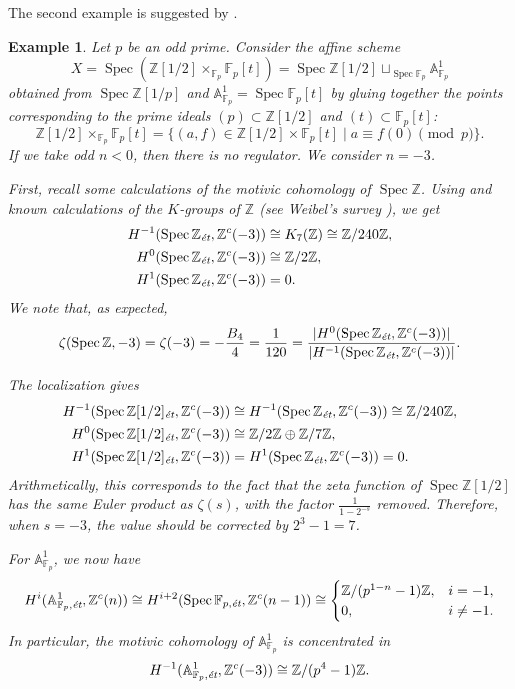 \documentclass[draft]{article}
\DeclareMathOperator{\Spec}{Spec}
\newcommand{\FF}{\mathbb{F}}
\newcommand{\ZZ}{\mathbb{Z}}
\renewcommand{\AA}{\mathbb{A}}
\newcommand{\et}{\text{\it \'{e}t}}
\theoremstyle{myplain}
\theoremstyle{mydefinition}
\newtheorem{example}[theorem]{Example}
\begin{document}
The second example is suggested by \cite[\S 7]{Jordan-Poonen-2020}.

\begin{example}
  Let $p$ be an odd prime. Consider the affine scheme
  \[ X = \Spec (\ZZ [1/2] \times_{\FF_p} \FF_p [t]) =
    \Spec \ZZ [1/2] \mathop{\sqcup}_{\Spec \FF_p} \AA^1_{\FF_p} \]
  obtained from $\Spec \ZZ [1/p]$ and $\AA^1_{\FF_p} = \Spec \FF_p [t]$ by
  gluing together the points corresponding to the prime ideals
  $(p) \subset \ZZ [1/2]$ and $(t) \subset \FF_p [t]$:
  \[ \ZZ [1/2] \times_{\FF_p} \FF_p [t] =
    \{ (a,f) \in \ZZ [1/2] \times \FF_p [t] \mid a \equiv f (0) \pmod{p} \}. \]
  If we take odd $n < 0$, then there is no regulator. We consider $n = -3$.

  First, recall some calculations of the motivic cohomology of $\Spec \ZZ$.
  Using \cite[Proposition~2.1]{Kolster-Sands-2008} and known calculations of the
  $K$-groups of $\ZZ$ (see Weibel's survey \cite{Weibel-2005}), we get
  \begin{align*}
    H^{-1} (\Spec \ZZ_\et, \ZZ^c (-3)) & \cong K_7 (\ZZ) \cong \ZZ/240\ZZ, \\
    H^0 (\Spec \ZZ_\et, \ZZ^c (-3)) & \cong \ZZ/2\ZZ, \\
    H^1 (\Spec \ZZ_\et, \ZZ^c (-3)) & = 0.
  \end{align*}
  We note that, as expected,
  \[ \zeta (\Spec \ZZ, -3) = \zeta (-3) = -\frac{B_4}{4} = \frac{1}{120} =
    \frac{|H^0 (\Spec \ZZ_\et, \ZZ^c (-3))|}{|H^{-1} (\Spec \ZZ_\et, \ZZ^c (-3))|}. \]

  The localization gives
  \begin{align*}
    H^{-1} (\Spec \ZZ [1/2]_\et, \ZZ^c (-3)) & \cong H^{-1} (\Spec \ZZ_\et, \ZZ^c (-3)) \cong \ZZ/240\ZZ, \\
    H^0 (\Spec \ZZ [1/2]_\et, \ZZ^c (-3)) & \cong \ZZ/2\ZZ \oplus \ZZ/7\ZZ, \\
    H^1 (\Spec \ZZ [1/2]_\et, \ZZ^c (-3)) & = H^1 (\Spec \ZZ_\et, \ZZ^c (-3)) = 0.
  \end{align*}
  Arithmetically, this corresponds to the fact that the zeta function of
  $\Spec \ZZ [1/2]$ has the same Euler product as $\zeta (s)$, with the factor
  $\frac{1}{1-2^{-s}}$ removed. Therefore, when $s = -3$, the value should be
  corrected by $2^3 - 1 = 7$.

  For $\AA^1_{\FF_p}$, we now have
  \[ H^i (\AA^1_{\FF_p, \et}, \ZZ^c (n)) \cong
    H^{i+2} (\Spec \FF_{p,\et}, \ZZ^c (n-1)) \cong
    \begin{cases}
      \ZZ/(p^{1-n} - 1)\ZZ, & i = -1, \\
      0, & i \ne -1.
    \end{cases} \]
  In particular, the motivic cohomology of $\AA^1_{\FF_p}$ is concentrated in
  \[ H^{-1} (\AA^1_{\FF_p, \et}, \ZZ^c (-3)) \cong \ZZ/(p^4-1)\ZZ. \]


\end{example}
\end{document}

